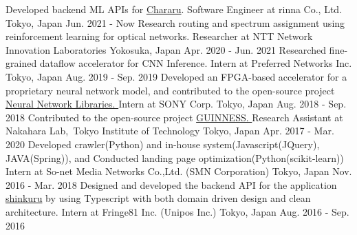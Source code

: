 
\begin{cventries}
  \eduentry
    {Developed backend ML APIs for \href{https://www.chararu.jp/}{Chararu}.} %
    {Software Engineer at rinna Co., Ltd.} %
    {Tokyo, Japan} %
    {Jun. 2021 - Now} %
  \eduentry
    {Research routing and spectrum assignment using reinforcement learning for optical networks. } %
    {Researcher at NTT Network Innovation Laboratories} %
    {Yokosuka, Japan} %
    {Apr. 2020 - Jun. 2021} %
  \eduentry
    {Researched fine-grained dataflow accelerator for CNN Inference. } %
    {Intern at Preferred Networks Inc.} %
    {Tokyo, Japan} %
    {Aug. 2019 - Sep. 2019} %
  \eduentry
    {Developed an FPGA-based accelerator for a proprietary neural network model, and contributed to the open-source project \href{https://github.com/sony/nnabla}{Neural Network Libraries. }} %
    {Intern at SONY Corp.} %
    {Tokyo, Japan} %
    {Aug. 2018 - Sep. 2018} %
  \eduentry
    {Contributed to the open-source project \href{https://github.com/HirokiNakahara/GUINNESS}{GUINNESS. }} %
    {Research Assistant at Nakahara Lab,\ Tokyo Institute of Technology} 
    {Tokyo, Japan} %
    {Apr. 2017 - Mar. 2020} %
  \eduentry
    {Developed crawler(Python) and in-house system(Javascript(JQuery), JAVA(Spring)), and Conducted landing page optimization(Python(scikit-learn))} %
    {Intern at So-net Media Networks Co.,Ltd. (SMN Corporation)} %
    {Tokyo, Japan} %
    {Nov. 2016 - Mar. 2018} %
  \eduentry
    {Designed and developed the backend API for the application \href{https://apps.apple.com/jp/app/id1016332071?l=en}{shinkuru} by using Typescript with both domain driven design and clean architecture.} %
    {Intern at Fringe81 Inc. (Unipos Inc.)} %
    {Tokyo, Japan} %
    {Aug. 2016 - Sep. 2016} %
\end{cventries}
